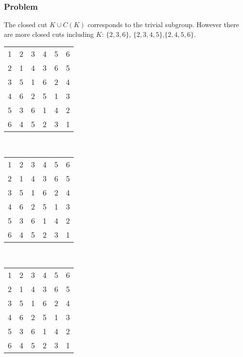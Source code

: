 \documentclass{beamer}
\begin{document}
\begin{frame}\frametitle{Problem}
The closed cut $K\cup C(K)$ corresponds to the trivial subgroup.  However there are more closed cuts including $K$: $\{2,3,6\}$, $\{2,3,4,5\}$,$\{2,4,5,6\}$.
\begin{center}
\begin{tabular}{@{}c@{}c@{}c@{}c@{}c@{}c@{}}
1&\color{lgr}2&\color{lgr}3&4&5&\color{lgr}6\\
\color{lgr}2&\color{lgr}1&\color{lgr}4&\color{lgr}3&\color{lgr}6&\color{lgr}5\\
\color{lgr}3&\color{lgr}5&\color{lgr}1&\color{lgr}6&\color{lgr}2&\color{lgr}4\\
4&\color{lgr}6&\color{lgr}2&5&1&\color{lgr}3\\
5&\color{lgr}3&\color{lgr}6&1&4&\color{lgr}2\\
\color{lgr}6&\color{lgr}4&\color{lgr}5&\color{lgr}2&\color{lgr}3&\color{lgr}1\\
\end{tabular}\ \ \ \ 
\begin{tabular}{@{}c@{}c@{}c@{}c@{}c@{}c@{}}
1&\color{lgr}2&\color{lgr}3&\color{lgr}4&\color{lgr}5&6\\
\color{lgr}2&\color{lgr}1&\color{lgr}4&\color{lgr}3&\color{lgr}6&\color{lgr}5\\
\color{lgr}3&\color{lgr}5&\color{lgr}1&\color{lgr}6&\color{lgr}2&\color{lgr}4\\
\color{lgr}4&\color{lgr}6&\color{lgr}2&\color{lgr}5&\color{lgr}1&\color{lgr}3\\
\color{lgr}5&\color{lgr}3&\color{lgr}6&\color{lgr}1&\color{lgr}4&\color{lgr}2\\
6&\color{lgr}4&\color{lgr}5&\color{lgr}2&\color{lgr}3&1\\
\end{tabular}\ \ \ \ 
\begin{tabular}{@{}c@{}c@{}c@{}c@{}c@{}c@{}}
1&\color{lgr}2&3&\color{lgr}4&\color{lgr}5&\color{lgr}6\\
\color{lgr}2&\color{lgr}1&\color{lgr}4&\color{lgr}3&\color{lgr}6&\color{lgr}5\\
3&\color{lgr}5&1&\color{lgr}6&\color{lgr}2&\color{lgr}4\\
\color{lgr}4&\color{lgr}6&\color{lgr}2&\color{lgr}5&\color{lgr}1&\color{lgr}3\\
\color{lgr}5&\color{lgr}3&\color{lgr}6&\color{lgr}1&\color{lgr}4&\color{lgr}2\\
\color{lgr}6&\color{lgr}4&\color{lgr}5&\color{lgr}2&\color{lgr}3&\color{lgr}1\\

\end{tabular}
\end{center}
\end{frame}
\end{document}

